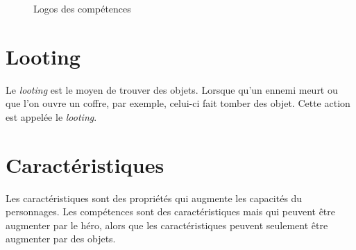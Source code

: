 \documentclass[11pt, a4paper, oneside]{report}
\begin{document}
\begin{figure}[ht]
\centering
{}
%
\caption{Logos des compétences}
\label{fig:competences}
\end{figure}

\section{Looting}
Le \emph{looting} est le moyen de trouver des objets. Lorsque qu'un ennemi meurt ou que l'on ouvre un coffre, par exemple, celui-ci fait tomber des objet. Cette action est appelée le \emph{looting}.
\section{Caractéristiques}
Les caractéristiques sont des propriétés qui augmente les capacités du personnages. Les compétences sont des caractéristiques mais qui peuvent être augmenter par le héro, alors que les caractéristiques peuvent seulement être augmenter par des objets.\\
\end{document}
